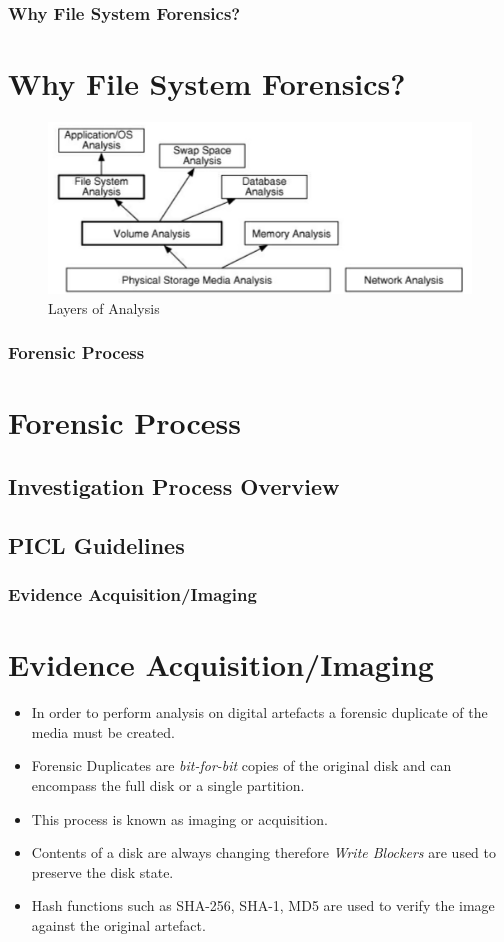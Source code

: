 \documentclass{beamer}
\begin{document}
\begin{frame}
	\frametitle{Why File System Forensics?}
	\section{Why File System Forensics?}
	\begin{figure}
		\includegraphics[scale=0.3]{digital-data-analysis-layers-BrianCarrier}
		\caption{Layers of Analysis}
	\end{figure}
\end{frame}

\begin{frame}
	\frametitle{Forensic Process}
	\section{Forensic Process}
		\subsection{Investigation Process Overview}
		\subsection{PICL Guidelines}
\end{frame}

\begin{frame}
	\frametitle{Evidence Acquisition/Imaging}
	\section{Evidence Acquisition/Imaging}
	\begin{itemize}
		\item In order to perform analysis on digital artefacts a forensic duplicate of the media must be created.
		\item Forensic Duplicates are \emph{bit-for-bit} copies of the original disk and can encompass the full disk or a single partition. 
		\item This process is known as imaging or acquisition.
		\item Contents of a disk are always changing therefore \emph{Write Blockers} are used to preserve the disk state.
		\item Hash functions such as SHA-256, SHA-1, MD5 are used to verify the image against the original artefact.
	\end{itemize}
\end{frame}
\end{document}
